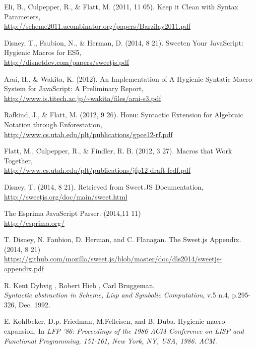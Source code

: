 %
%
%
%
\begin{thebibliography}{10}

 Eli, B., Culpepper, R., \& Flatt, M. (2011, 11 05). Keep it Clean with Syntax Parameters,\\
\url{http://scheme2011.ucombinator.org/papers/Barzilay2011.pdf}

 Disney, T., Faubion, N., \& Herman, D. (2014, 8 21). Sweeten Your JavaScript: Hygienic Macros for ES5,\\
\url{http://disnetdev.com/papers/sweetjs.pdf}

 Arai, H., \& Wakita, K. (2012). An Implementation of A Hygienic Syntatic Macro System for JavaScript: A Preliminary Report,\\
\url{http://www.is.titech.ac.jp/~wakita/files/arai-s3.pdf}

 Rafkind, J., \& Flatt, M. (2012, 9 26). Honu: Syntactic Extension for Algebraic Notation through Enforestation,\\
\url{http://www.cs.utah.edu/plt/publications/gpce12-rf.pdf}

 Flatt, M., Culpepper, R., \& Findler, R. B. (2012, 3 27). Macros that Work Together,\\
\url{http://www.cs.utah.edu/plt/publications/jfp12-draft-fcdf.pdf}

 Disney, T. (2014, 8 21). Retrieved from Sweet.JS Documentation,\\
\url{http://sweetjs.org/doc/main/sweet.html}

 The Esprima JavaScript Parser. (2014,11 11)\\
\url{http://esprima.org/}

T. Disney, N. Faubion, D. Herman, and C. Flanagan. The Sweet.js Appendix. (2014, 8 21)\\
\url{https://github.com/mozilla/sweet.js/blob/master/doc/dls2014/sweetjs-appendix.pdf}

R. Kent Dybvig , Robert Hieb , Carl Bruggeman,\\ {\it Syntactic abstraction in Scheme, Lisp and Symbolic Computation}, v.5 n.4, p.295-326, Dec. 1992.

 E. Kohlbeker, D.p. Friedman, M.Felleisen, and B. Duba. Hygienic macro expansion. In {\it LFP '86: Proceedings of the 1986 ACM Conference on LISP and Functional Programming, 151-161, New York, NY, USA, 1986. ACM.}


\end{thebibliography}
